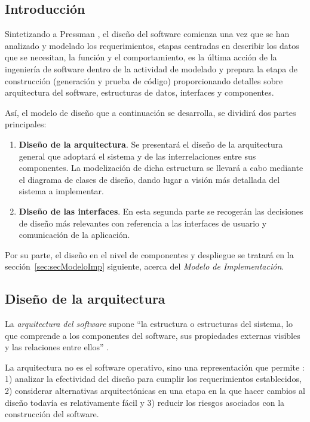 \subsection{Introducción}

Sintetizando a Pressman \cite{Pre10}, el diseño del software comienza una vez que se han analizado y modelado los requerimientos, etapas centradas en describir los datos que se necesitan, la función y el comportamiento, es la última acción de la ingeniería de software dentro de la actividad de modelado y prepara la etapa de construcción (generación y prueba de código) proporcionando detalles sobre arquitectura del software, estructuras de datos, interfaces y componentes.

Así, el modelo de diseño que a continuación se desarrolla, se dividirá dos partes principales:

\begin{enumerate}
	\item \textbf{Diseño de la arquitectura}. Se presentará el diseño de la arquitectura general que adoptará el sistema y de las interrelaciones entre sus componentes. La modelización de dicha estructura se llevará a cabo mediante el diagrama de clases de diseño, dando lugar a visión más detallada del sistema a implementar.
	\item \textbf{Diseño de las interfaces}. En esta segunda parte se recogerán las decisiones de diseño más relevantes con referencia a las interfaces de usuario y comunicación de la aplicación.
\end{enumerate}

Por su parte, el diseño en el nivel de componentes y despliegue se tratará en la sección~\ref{sec:secModeloImp} siguiente, acerca del \emph{Modelo de Implementación}.

\subsection{Diseño de la arquitectura}

La \emph{arquitectura del software} supone ``la estructura o estructuras del sistema, lo que comprende a los componentes del software, sus propiedades externas visibles y las relaciones entre ellos'' \cite{Bas03}.

La arquitectura no es el software operativo, sino una representación que permite \cite{Pre10}: 1) analizar la efectividad del diseño para cumplir los requerimientos establecidos, 2) considerar alternativas arquitectónicas en una etapa en la que hacer cambios al diseño todavía es relativamente fácil y 3) reducir los riesgos asociados con la construcción del software.


